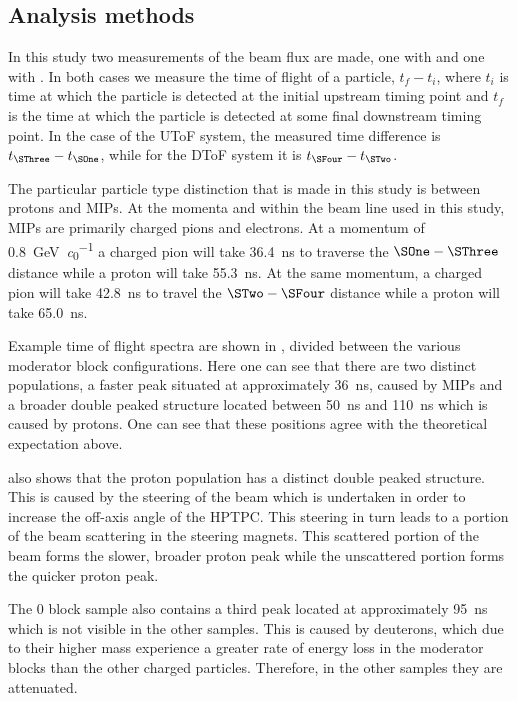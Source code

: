 \subsection{Analysis methods}
\label{sec:hptpc_beam_flux:methods:general}

In this study two measurements of the beam flux are made, one with \SThree and one with \SFour.
In both cases we measure the time of flight of a particle, $t_{f}-t_{i}$, where $t_{i}$ is time at which the particle is detected at the initial upstream timing point and $t_{f}$ is the time at which the particle is detected at some final downstream timing point.
In the case of the UToF system, the measured time difference is $t_{\SThree} - t_{\SOne}$, while for the DToF system it is $t_{\SFour} - t_{\STwo}$.

The particular particle type distinction that is made in this study is between protons and MIPs.
At the momenta and within the beam line used in this study, MIPs are primarily charged pions and electrons.
At a momentum of \SI{0.8}{\giga\electronvolt\per\clight} a charged pion will take \SI{36.4}{\nano\second} to traverse the $\SOne - \SThree$ distance while a proton will take \SI{55.3}{\nano\second}.
At the same momentum, a charged pion will take \SI{42.8}{\nano\second} to travel the $\STwo - \SFour$ distance while a proton will take \SI{65.0}{\nano\second}.

Example time of flight spectra are shown in , divided between the various moderator block configurations.
Here one can see that there are two distinct populations, a faster peak situated at approximately \SI{36}{\nano\second}, caused by MIPs and a broader double peaked structure located between \SI{50}{\nano\second} and \SI{110}{\nano\second} which is caused by protons.
One can see that these positions agree with the theoretical expectation above.

 also shows that the proton population has a distinct double peaked structure.
This is caused by the steering of the beam which is undertaken in order to increase the off-axis angle of the HPTPC.
This steering in turn leads to a portion of the beam scattering in the steering magnets.
This scattered portion of the beam forms the slower, broader proton peak while the unscattered portion forms the quicker proton peak.

The 0 block sample also contains a third peak located at approximately \SI{95}{\nano\second} which is not visible in the other samples.
This is caused by deuterons, which due to their higher mass experience a greater rate of energy loss in the moderator blocks than the other charged particles.
Therefore, in the other samples they are attenuated.

